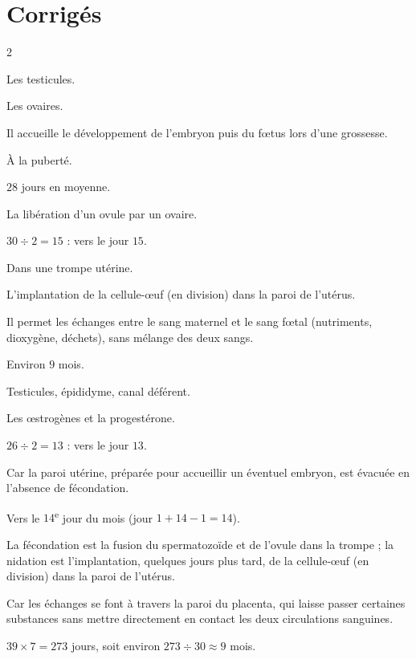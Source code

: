\section{Corrigés}
\begin{multicols}{2}

Les testicules.

Les ovaires.

Il accueille le développement de l'embryon puis du fœtus lors d'une grossesse.

À la puberté.

$28$ jours en moyenne.

La libération d'un ovule par un ovaire.

$30\div2=15$ : vers le jour $15$.

Dans une trompe utérine.

L'implantation de la cellule-œuf (en division) dans la paroi de l'utérus.

Il permet les échanges entre le sang maternel et le sang fœtal (nutriments, dioxygène,
déchets), sans mélange des deux sangs.

Environ $9$ mois.

Testicules, épididyme, canal déférent.

Les œstrogènes et la progestérone.

$26\div2=13$ : vers le jour $13$.

Car la paroi utérine, préparée pour accueillir un éventuel embryon, est évacuée en
l'absence de fécondation.

Vers le $14$\textsuperscript{e} jour du mois (jour $1+14-1=14$).

La fécondation est la fusion du spermatozoïde et de l'ovule dans la trompe ; la nidation
est l'implantation, quelques jours plus tard, de la cellule-œuf (en division) dans la
paroi de l'utérus.

Car les échanges se font à travers la paroi du placenta, qui laisse passer certaines
substances sans mettre directement en contact les deux circulations sanguines.

$39\times7=273$ jours, soit environ $273\div30\approx9$ mois.


\end{multicols}
